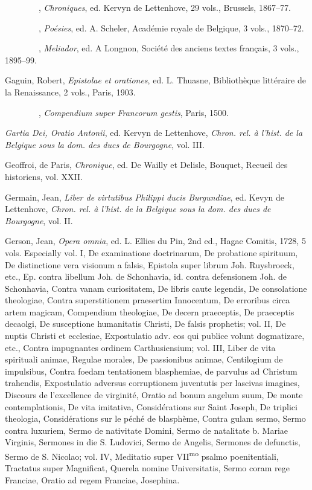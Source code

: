 {~~~~~~~~}, \emph{Chroniques}, ed. Kervyn de Lettenhove, 29 vols.,
Brussels, 1867--77.

{~~~~~~~~}, \emph{Poésies}, ed. A. Scheler, Académie royale de Belgique,
3 vols., 1870--72.

{~~~~~~~~}, \emph{Meliador}, ed. A Longnon, Société des anciens textes
français, 3 vols., 1895--99.

Gaguin, Robert, \emph{Epistolae et orationes}, ed. L. Thuasne,
Bibliothèque littéraire de la Renaissance, 2 vols., Paris, 1903.

{~~~~~~~~}, \emph{Compendium super Francorum gestis}, Paris, 1500.

\emph{Gartia Dei, Oratio Antonii}, ed. Kervyn de Lettenhove,
\emph{Chron. rel. à l'hist. de la Belgique sous la dom. des ducs de
Bourgogne}, vol. III.

Geoffroi, de Paris, \emph{Chronique}, ed. De Wailly et Delisle, Bouquet,
Recueil des historiens, vol. XXII.

Germain, Jean, \emph{Liber de virtutibus Philippi ducis Burgundiae}, ed.
Kevyn de Lettenhove, \emph{Chron. rel. à l'hist. de la Belgique sous la
dom. des ducs de Bourgogne}, vol. II.

Gerson, Jean, \emph{Opera omnia}, ed. L. Ellies du Pin, 2nd ed., Hagae
Comitis, 1728, 5 vols. Especially vol. I, De examinatione doctrinarum,
De probatione spirituum, De distinctione vera visionum a falsis,
Epistola super librum Joh. Ruysbroeck, etc., Ep. contra libellum Joh. de
Schonhavia, id. contra defensionem Joh. de Schonhavia, Contra vanam
curiositatem, De libris caute legendis, De consolatione theologiae,
Contra superstitionem praesertim Innocentum, De erroribus circa artem
magicam, Compendium theologiae, De decern praeceptis, De praeceptis
decaolgi, De susceptione humanitatis Christi, De falsis prophetis; vol.
II, De nuptis Christi et ecclesiae, Expostulatio adv. eos qui publice
volunt dogmatizare, etc., Contra impugnantes ordinem Carthusiensium;
vol. III, Liber de vita spirituali animae, Regulae morales, De
passionibus animae,
Centi\protect\hypertarget{24_BIBLIOGRAPHY.xhtmlux5cux23page_445}{}{}logium
de impulsibus, Contra foedam tentationem blasphemiae, de parvulus ad
Christum trahendis, Expostulatio adversus corruptionem juventutis per
lascivas imagines, Discours de l'excellence de virginité, Oratio ad
bonum angelum suum, De monte contemplationis, De vita imitativa,
Considérations sur Saint Joseph, De triplici theologia, Considérations
sur le péché de blasphème, Contra gulam sermo, Sermo contra luxuriem,
Sermo de nativitate Domini, Sermo de natalitate b. Mariae Virginis,
Sermones in die S. Ludovici, Sermo de Angelis, Sermones de defunctis,
Sermo de S. Nicolao; vol. IV, Meditatio super VII\textsuperscript{mo}
psalmo poenitentiali, Tractatus super Magnificat, Querela nomine
Universitatis, Sermo coram rege Franciae, Oratio ad regem Franciae,
Josephina.

